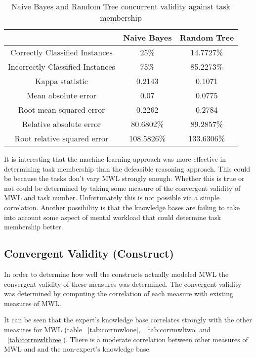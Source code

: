 \begin{table}[!htbp]
\centering
\begin{tabular}{|c|c|c|}
\hline
                                 & Naive Bayes & Random Tree\\ \hline
Correctly Classified Instances   & 25\%      &  14.7727\%\\
Incorrectly Classified Instances & 75\%      &  85.2273\%\\
Kappa statistic                  & 0.2143    & 0.1071\\
Mean absolute error              & 0.07      & 0.0775\\
Root mean squared error          & 0.2262    & 0.2784\\
Relative absolute error          & 80.6802\% & 89.2857\%\\
Root relative squared error      & 108.5826\% & 133.6306\%\\
\hline
\end{tabular}
\caption{Naive Bayes and Random Tree concurrent validity against task membership}
\label{tab:ml2currenttask}
\end{table}

It is interesting that the machine learning approach was more effective in determining task membership than the defeasible reasoning approach. This could be because the tasks don't vary MWL strongly enough. Whether this is true or not could be determined by taking some measure of the convergent validity of MWL and task number. Unfortunately this is not possible via a simple correlation. Another possibility is that the knowledge bases are failing to take into account some aspect of mental workload that could determine task membership better.

\subsection{Convergent Validity (Construct)}

In order to determine how well the constructs actually modeled MWL the convergent validity of these measures was determined. The convergent validity was determined by computing the correlation of each measure with existing measures of MWL. 

It can be seen that the expert's knowledge base correlates strongly with the other measures for MWL (table ~\ref{tab:corrmwlone}, ~\ref{tab:corrmwltwo} and ~\ref{tab:corrmwlthree}). There is a moderate correlation between other measures of MWL and and the non-expert's knowledge base. 

